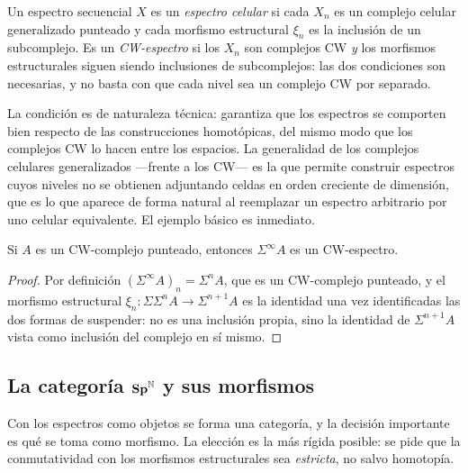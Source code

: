 \begin{defi}\label{defi:espectro-celular}
Un espectro secuencial $X$ es un \emph{espectro celular} si cada $X_n$ es un complejo celular generalizado punteado y cada morfismo estructural $\xi_n$ es la inclusión de un subcomplejo. Es un \emph{CW-espectro} si los $X_n$ son complejos CW \emph{y} los morfismos estructurales siguen siendo inclusiones de subcomplejos: las dos condiciones son necesarias, y no basta con que cada nivel sea un complejo CW por separado.
\end{defi}

La condición es de naturaleza técnica: garantiza que los espectros se comporten bien respecto de las construcciones homotópicas, del mismo modo que los complejos CW lo hacen entre los espacios. La generalidad de los complejos celulares generalizados ---frente a los CW--- es la que permite construir espectros cuyos niveles no se obtienen adjuntando celdas en orden creciente de dimensión, que es lo que aparece de forma natural al reemplazar un espectro arbitrario por uno celular equivalente. El ejemplo básico es inmediato.

\begin{ejem}\label{ejem:suspension-cw}
Si $A$ es un CW-complejo punteado, entonces $\Sigma^\infty A$ es un CW-espectro.
\end{ejem}

\begin{proof}
Por definición $(\Sigma^\infty A)_n=\Sigma^nA$, que es un CW-complejo punteado, y el morfismo estructural $\xi_n\colon\Sigma\Sigma^nA\to\Sigma^{n+1}A$ es la identidad una vez identificadas las dos formas de suspender: no es una inclusión propia, sino la identidad de $\Sigma^{n+1}A$ vista como inclusión del complejo en sí mismo. \qedhere
\end{proof}

\subsection{La categoría \texorpdfstring{$\mathbf{Sp}^{\mathbb{N}}$}{SpN} y sus morfismos}

Con los espectros como objetos se forma una categoría, y la decisión importante es qué se toma como morfismo. La elección es la más rígida posible: se pide que la conmutatividad con los morfismos estructurales sea \emph{estricta}, no salvo homotopía.

